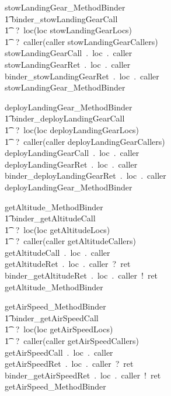 %
%
\begin{circusaction}
stowLandingGear\_MethodBinder \circdef \\
	\t1 \circblockopen
	binder\_stowLandingGearCall\\ \t1 ~?~loc\prefixcolon(loc \in stowLandingGearLocs)\\ \t1 ~?~caller\prefixcolon(caller \in stowLandingGearCallers)  \then \\
	stowLandingGearCall~.~loc~.~caller  \then \\
	stowLandingGearRet~.~loc~.~caller \then \\
	binder\_stowLandingGearRet~.~loc~.~caller  \then \\
	stowLandingGear\_MethodBinder
	\circblockclose
\end{circusaction}
%
%
\begin{circusaction}
deployLandingGear\_MethodBinder \circdef \\
	\t1 \circblockopen
	binder\_deployLandingGearCall\\ \t1 ~?~loc\prefixcolon(loc \in deployLandingGearLocs)\\ \t1 ~?~caller\prefixcolon(caller \in deployLandingGearCallers)  \then \\
	deployLandingGearCall~.~loc~.~caller  \then \\
	deployLandingGearRet~.~loc~.~caller \then \\
	binder\_deployLandingGearRet~.~loc~.~caller  \then \\
	deployLandingGear\_MethodBinder
	\circblockclose
\end{circusaction}
%
%
\begin{circusaction}
getAltitude\_MethodBinder \circdef \\
	\t1 \circblockopen
	binder\_getAltitudeCall\\ \t1 ~?~loc\prefixcolon(loc \in getAltitudeLocs)\\ \t1 ~?~caller\prefixcolon(caller \in getAltitudeCallers)  \then \\
	getAltitudeCall~.~loc~.~caller  \then \\
	getAltitudeRet~.~loc~.~caller~?~ret \then \\
	binder\_getAltitudeRet~.~loc~.~caller~!~ret  \then \\
	getAltitude\_MethodBinder
	\circblockclose
\end{circusaction}
%
%
\begin{circusaction}
getAirSpeed\_MethodBinder \circdef \\
	\t1 \circblockopen
	binder\_getAirSpeedCall\\ \t1 ~?~loc\prefixcolon(loc \in getAirSpeedLocs)\\ \t1 ~?~caller\prefixcolon(caller \in getAirSpeedCallers)  \then \\
	getAirSpeedCall~.~loc~.~caller  \then \\
	getAirSpeedRet~.~loc~.~caller~?~ret \then \\
	binder\_getAirSpeedRet~.~loc~.~caller~!~ret  \then \\
	getAirSpeed\_MethodBinder
	\circblockclose
\end{circusaction}
